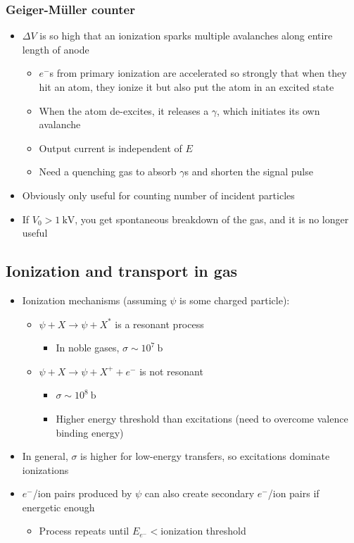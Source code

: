 \documentclass[11pt]{article}
\newcommand{\ba}{\text{b}}
\newcommand{\el}{\ensuremath{e^{-}}\xspace}
\begin{document}
\subsubsection{Geiger-M\"uller counter}
\begin{itemize}
  \item $\Delta V$ is so high that an ionization sparks multiple avalanches along entire length of anode
  \begin{itemize}
    \item $\el$s from primary ionization are accelerated so strongly that when they hit an atom, they ionize it but also put the atom in an excited state
    \item When the atom de-excites, it releases a $\gamma$, which initiates its own avalanche
    \item Output current is independent of $E$
    \item Need a quenching gas to absorb $\gamma$s and shorten the signal pulse
  \end{itemize}
  \item Obviously only useful for counting number of incident particles
  \item If $V_0 > 1~\text{kV}$, you get spontaneous breakdown of the gas, and it is no longer useful
\end{itemize}

\subsection{Ionization and transport in gas}
\begin{itemize}
  \item Ionization mechanisms (assuming $\psi$ is some charged particle):
  \begin{itemize}
    \item $\psi+X\rightarrow\psi+X^*$ is a resonant process
    \begin{itemize}
      \item In noble gases, $\sigma\sim 10^7~\ba$
    \end{itemize}
    \item $\psi+X \rightarrow \psi+X^++\el$ is not resonant
    \begin{itemize}
      \item $\sigma\sim 10^8~\ba$
      \item Higher energy threshold than excitations (need to overcome valence binding energy)
    \end{itemize}
  \end{itemize}
  \item In general, $\sigma$ is higher for low-energy transfers, so excitations dominate ionizations
  \item $\el$/ion pairs produced by $\psi$ can also create secondary $\el$/ion pairs if energetic enough
  \begin{itemize}
    \item Process repeats until $E_{\el}<$ionization threshold
  \end{itemize}
\end{itemize}
\end{document}
